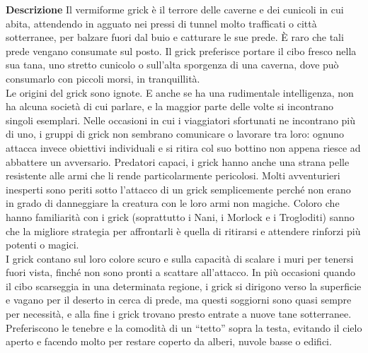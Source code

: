 \begin{multicols}{2}
\textbf{Descrizione}
Il vermiforme grick è il terrore delle caverne e dei cunicoli in cui abita, attendendo in agguato nei pressi di tunnel molto trafficati o città sotterranee, per balzare fuori dal buio e catturare le sue prede. È raro che tali prede vengano consumate sul posto. Il grick preferisce portare il cibo fresco nella sua tana, uno stretto cunicolo o sull'alta sporgenza di una caverna, dove può consumarlo con piccoli morsi, in tranquillità.\\
Le origini del grick sono ignote. E anche se ha una rudimentale intelligenza, non ha alcuna società di cui parlare, e la maggior parte delle volte si incontrano singoli esemplari. Nelle occasioni in cui i viaggiatori sfortunati ne incontrano più di uno, i gruppi di grick non sembrano comunicare o lavorare tra loro: ognuno attacca invece obiettivi individuali e si ritira col suo bottino non appena riesce ad abbattere un avversario. Predatori capaci, i grick hanno anche una strana pelle resistente alle armi che li rende particolarmente pericolosi. Molti avventurieri inesperti sono periti sotto l'attacco di un grick semplicemente perché non erano in grado di danneggiare la creatura con le loro armi non magiche. Coloro che hanno familiarità con i grick (soprattutto i Nani, i Morlock e i Trogloditi) sanno che la migliore strategia per affrontarli è quella di ritirarsi e attendere rinforzi più potenti o magici.\\
I grick contano sul loro colore scuro e sulla capacità di scalare i muri per tenersi fuori vista, finché non sono pronti a scattare all'attacco. In più occasioni quando il cibo scarseggia in una determinata regione, i grick si dirigono verso la superficie e vagano per il deserto in cerca di prede, ma questi soggiorni sono quasi sempre per necessità, e alla fine i grick trovano presto entrate a nuove tane sotterranee. Preferiscono le tenebre e la comodità di un “tetto” sopra la testa, evitando il cielo aperto e facendo molto per restare coperto da alberi, nuvole basse o edifici.\\



\end{multicols}
